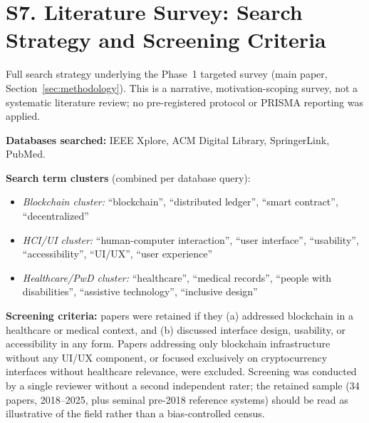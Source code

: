 \documentclass[10pt]{article}
\begin{document}
\section*{S7. Literature Survey: Search Strategy and Screening Criteria}
Full search strategy underlying the Phase~1 targeted survey (main paper, Section~\ref{sec:methodology}). This is a narrative, motivation-scoping survey, not a systematic literature review; no pre-registered protocol or PRISMA reporting was applied.

\textbf{Databases searched:} IEEE Xplore, ACM Digital Library, SpringerLink, PubMed.

\textbf{Search term clusters} (combined per database query):
\begin{itemize}
\item \textit{Blockchain cluster:} ``blockchain'', ``distributed ledger'', ``smart contract'', ``decentralized''
\item \textit{HCI/UI cluster:} ``human-computer interaction'', ``user interface'', ``usability'', ``accessibility'', ``UI/UX'', ``user experience''
\item \textit{Healthcare/PwD cluster:} ``healthcare'', ``medical records'', ``people with disabilities'', ``assistive technology'', ``inclusive design''
\end{itemize}

\textbf{Screening criteria:} papers were retained if they (a) addressed blockchain in a healthcare or medical context, and (b) discussed interface design, usability, or accessibility in any form. Papers addressing only blockchain infrastructure without any UI/UX component, or focused exclusively on cryptocurrency interfaces without healthcare relevance, were excluded. Screening was conducted by a single reviewer without a second independent rater; the retained sample (34 papers, 2018--2025, plus seminal pre-2018 reference systems) should be read as illustrative of the field rather than a bias-controlled census.
\end{document}
